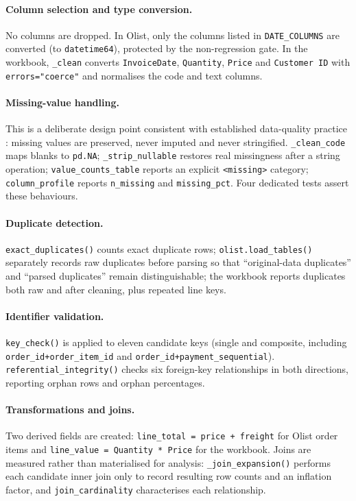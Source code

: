 \documentclass[11pt,a4paper]{article}
\newcommand{\code}[1]{\texttt{#1}}
\begin{document}
\paragraph{Column selection and type conversion.} No columns are dropped. In Olist, only the columns listed in \code{DATE\_COLUMNS} are converted (to \code{datetime64}), protected by the non-regression gate. In the workbook, \code{\_clean} converts \code{InvoiceDate}, \code{Quantity}, \code{Price} and \code{Customer ID} with \code{errors="coerce"} and normalises the code and text columns.

\paragraph{Missing-value handling.} This is a deliberate design point consistent with established data-quality practice \cite{batini2009}: missing values are preserved, never imputed and never stringified. \code{\_clean\_code} maps blanks to \code{pd.NA}; \code{\_strip\_nullable} restores real missingness after a string operation; \code{value\_counts\_table} reports an explicit \code{<missing>} category; \code{column\_profile} reports \code{n\_missing} and \code{missing\_pct}. Four dedicated tests assert these behaviours.

\paragraph{Duplicate detection.} \code{exact\_duplicates()} counts exact duplicate rows; \code{olist.load\_tables()} separately records raw duplicates before parsing so that ``original-data duplicates'' and ``parsed duplicates'' remain distinguishable; the workbook reports duplicates both raw and after cleaning, plus repeated line keys.

\paragraph{Identifier validation.} \code{key\_check()} is applied to eleven candidate keys (single and composite, including \code{order\_id+order\_item\_id} and \code{order\_id+payment\_sequential}). \code{referential\_integrity()} checks six foreign-key relationships in both directions, reporting orphan rows and orphan percentages.

\paragraph{Transformations and joins.} Two derived fields are created: \code{line\_total = price + freight} for Olist order items and \code{line\_value = Quantity * Price} for the workbook. Joins are measured rather than materialised for analysis: \code{\_join\_expansion()} performs each candidate inner join only to record resulting row counts and an inflation factor, and \code{join\_cardinality} characterises each relationship.
\end{document}
